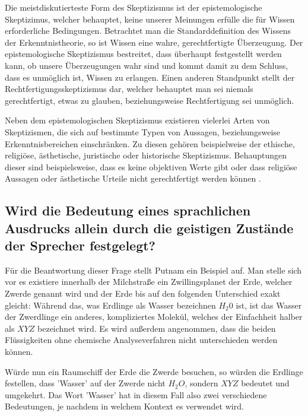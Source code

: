 \documentclass[a4paper]{article}
\begin{document}
Die meistdiskutierteste Form des Skeptizismus ist der epistemologische Skeptizimus, welcher behauptet, keine unserer Meinungen erfülle die für Wissen erforderliche Bedingungen. Betrachtet man die Standarddefinition des Wissens der Erkenntnistheorie, so ist Wissen eine wahre, gerechtfertigte Überzeugung. Der epistemologische Skeptizismus bestreitet, dass überhaupt festgestellt werden kann, ob unsere Überzeugungen wahr sind und kommt damit zu dem Schluss, dass es unmöglich ist, Wissen zu erlangen. Einen anderen Standpunkt stellt der Rechtfertigungsskeptizismus dar, welcher behauptet man sei niemals gerechtfertigt, etwas zu glauben, beziehungsweise Rechtfertigung sei unmöglich.

Neben dem epistemologischen Skeptizismus existieren vielerlei Arten von Skeptizismen, die sich auf bestimmte Typen von Aussagen, beziehungsweise Erkenntnisbereichen einschränken. Zu diesen gehören beispielweise der ethische, religiöse, ästhetische, juristische oder historische Skeptizismus. Behauptungen dieser sind beispielsweise, dass es keine objektiven Werte gibt oder dass religiöse Aussagen oder ästhetische Urteile nicht gerechtfertigt werden können \cite[561 f.]{metzler}.

\setcounter{section}{7}
\setcounter{subsection}{0}
\subsection{Wird die Bedeutung eines sprachlichen Ausdrucks allein durch die geistigen Zustände der Sprecher festgelegt?}
Für die Beantwortung dieser Frage stellt Putnam \cite{putnam} ein Beispiel auf. Man stelle sich vor es existiere innerhalb der Milchstraße ein Zwillingsplanet der Erde, welcher Zwerde genannt wird und der Erde bis auf den folgenden Unterschied exakt gleicht: Während das, was Erdlinge als Wasser bezeichnen $H_2 0$ ist, ist das Wasser der Zwerdlinge ein anderes, kompliziertes Molekül, welches der Einfachheit halber als $XYZ$ bezeichnet wird. Es wird außerdem angenommen, dass die beiden Flüssigkeiten ohne chemische Analyseverfahren nicht unterschieden werden können.

Würde nun ein Raumschiff der Erde die Zwerde besuchen, so würden die Erdlinge festellen, dass 'Wasser' auf der Zwerde nicht $H_2 O$, sondern $XYZ$ bedeutet und umgekehrt. Das Wort 'Wasser' hat in diesem Fall also zwei verschiedene Bedeutungen, je nachdem in welchem Kontext es verwendet wird.
\end{document}
